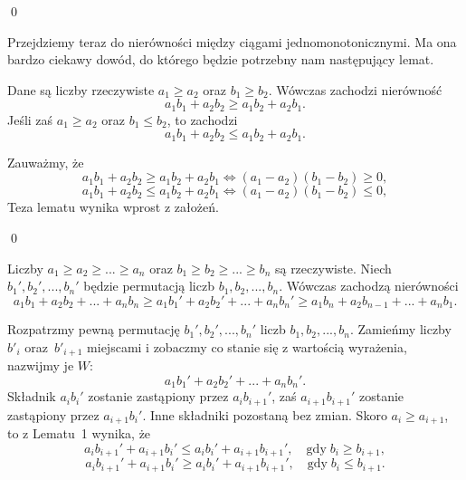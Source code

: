 \qed
\newpage

\noindent


\noindent
Przejdziemy teraz do nierówności między ciągami jednomonotonicznymi. Ma ona bardzo ciekawy dowód, do którego będzie potrzebny nam następujący lemat.

\vspace{10px}


\noindent
Dane są liczby rzeczywiste $a_1 \geqslant a_2$ oraz $b_1 \geqslant b_2$. Wówczas zachodzi nierówność
\[
	a_1b_1 + a_2b_2 \geqslant a_1b_2 + a_2b_1.
\] 
Jeśli zaś $a_1 \geqslant a_2$ oraz $b_1 \leqslant b_2$, to zachodzi
\[
	a_1b_1 + a_2b_2 \leqslant a_1b_2 + a_2b_1.
\] 


\noindent
Zauważmy, że
\[
	a_1b_1 + a_2b_2 \geqslant a_1b_2 + a_2b_1 \iff (a_1 - a_2)(b_1 - b_2) \geqslant 0,
\]
\[
	a_1b_1 + a_2b_2 \leqslant a_1b_2 + a_2b_1 \iff (a_1 - a_2)(b_1 - b_2) \leqslant 0,
\]
Teza lematu wynika wprost z założeń.

\qed

\vspace{10px}



\noindent
Liczby $a_1 \geqslant a_2 \geqslant ... \geqslant a_n$ oraz $b_1 \geqslant b_2 \geqslant ... \geqslant b_n$ są rzeczywiste. Niech $b_1', b_2', ..., b_n'$ będzie permutacją liczb $b_1, b_2, ..., b_n$. Wówczas zachodzą nierówności
\[
	a_1b_1 + a_2b_2 + ... + a_nb_n \geqslant a_1b_1' + a_2b_2' + ... + a_nb_n' \geqslant a_1b_n + a_2b_{n - 1} + ... + a_nb_1.
\]


\noindent
Rozpatrzmy pewną permutację $b_1', b_2', ..., b_n'$ liczb $b_1, b_2, ..., b_n$.  Zamieńmy liczby $b'_i$ oraz~$b'_{i + 1}$ miejscami i zobaczmy co stanie się z wartością wyrażenia, nazwijmy je $W$:
\[
	a_1b_1' + a_2b_2' + ... + a_nb_n'.
\]
Składnik $a_ib_i'$ zostanie zastąpiony przez $a_ib_{i + 1}'$, zaś $a_{i + 1}b_{i + 1}'$ zostanie zastąpiony przez $a_{i + 1}b_i'$. Inne składniki pozostaną bez zmian. Skoro $a_i \geqslant a_{i + 1}$, to z Lematu~1 wynika, że
\[
	a_ib_{i + 1}' + a_{i + 1}b_i' \leqslant a_ib_i' + a_{i + 1}b_{i + 1}', \quad \text{gdy} \; b_i \geqslant b_{i + 1},
\]
\[
	a_ib_{i + 1}' + a_{i + 1}b_i' \geqslant a_ib_i' + a_{i + 1}b_{i + 1}', \quad \text{gdy} \; b_i \leqslant b_{i + 1}.
\]

